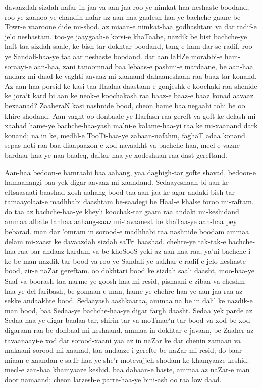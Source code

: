 \documentclass{article}
\begin{document}
davaazdah sizdah nafar in-jaa va aan-jaa roo-ye nimkat-haa neshaste boodand,
roo-ye zaanoo-ye chandin nafar az aan-haa gaalesh-haa-ye bachche-gaane be
Towr-e vaaroone dide mi-shod.  az miaan-e nimkat-haa godhashtam va dar radif-e
jelo neshastam.  too-ye jaaygaah-e korsi-e khaTaabe, nazdik be bist
bachche-ye haft taa sizdah saale, ke bish-tar dokhtar boodand, tang-e ham
dar se radif, roo-ye Sandali-haa-ye taalaar neshaste boodand.  dar aan laHZe
morabbi-e ham-soraayi-e aan-haa, zani tanoomnad baa lebaas-e pashmi-e
mardaane, be aan-haa andarz mi-daad ke vaghti aavaaz mi-xaanand
dahaaneshaan raa baaz-tar konand.  Az aan-haa porsid ke kasi taa Haalaa
daastaan-e gonjeshk-e koochaki raa shenide ke jora`t kard bi aan ke neok-e
koochakash raa baaz-e baaz-e baaz konad aavaaz bexaanad?  ZaaheraN kasi
nashnide bood, cheon hame baa negaahi tohi be oo khire shodand.  Aan vaght oo
donbaale-ye Harfash raa gereft va goft ke delash mi-xaahad hame-ye
bachche-haa-yash ma'ni-e kalame-haa-yi raa ke mi-xaanand dark konand;
na in ke, medhl-e TooTi-haa-ye zabaan-nafahm, faghaT adaa konand.  sepas noti
raa baa diaapaazon-e xod navaakht va bachche-haa, mecl-e
vazne-bardaar-haa-ye naa-baaleq, daftar-haa-ye xodeshaan raa dast
gereftand.

Aan-haa bedoon-e hamraahi baa aahang, yaa daghigh-tar gofte shavad, bedoon-e
hamaahangi baa yek-digar aavaaz mi-xaandand.  Sedaayeshaan bi aan ke
eHsaasaati baashad xosh-aahang bood taa aan jaa ke agar andaki bish-tar
tamaayolaat-e madhhabi daashtam be-saadegi be Haal-e khalse foroo mi-raftam. 
do taa az bachche-haa-ye kheyli koochak-tar gaam raa andaki mi-keshidand
ammaa albate tanhaa aahang-saaz mi-tavaanest be khaTaa-ye aan-haa pey
bebarad.  man dar 'omram in sorood-e madhhabi raa nashnide boodam ammaa delam
mi-xaast ke davaazdah sizdah saTri baashad.  chehre-ye tak-tak-e
bachche-haa raa bar-andaaz kardam va be-khoSooS yeki az aan-haa raa, ya'ni
bachche-i ke be man nazdik-tar bood va roo-ye Sandali-ye aakhar-e radif-e
jelo neshaste bood, zir-e naZar gereftam.  oo dokhtari bood ke sizdah saali
daasht, moo-haa-ye Saaf va boorash taa narme-ye goosh-haa mi-resid,
pishaani-e zibaa va cheshm-haa-ye del-faribash, be-gomaan-e man, hame-ye
chehre-haa-ye aan-jaa raa az sekke andaakhte bood.  Sedaayash aashkaaraa,
ammaa na be in dalil ke nazdik-e man bood, baa Sedaa-ye bachche-haa-ye digar
fargh daasht.  Sedaa yek parde az Sedaa-haa-ye digar baalaa-tar, shirin-tar
va moTmae`n-tar bood va xod-be-xod digaraan raa be donbaal mi-keshaand. 
ammaa in dokhtar-e javaan, be Zaaher az tavaanaayi-e xod dar sorood-xaani
yaa az in naZar ke dar chenin zamaan va makaani sorood mi-xaanad, taa
andaaze-i gerefte be naZar mi-resid; do baar miaan-e xaandan-e saTr-haa-ye
she'r motevajjeh shodam ke khamyaaze keshid.  mecl-e zan-haa khamyaaze
keshid.  baa dahaan-e baste, ammaa az naZar-e man door namaand; cheon
larzesh-e parre-haa-ye bini-ash oo raa low daad.
\end{document}
